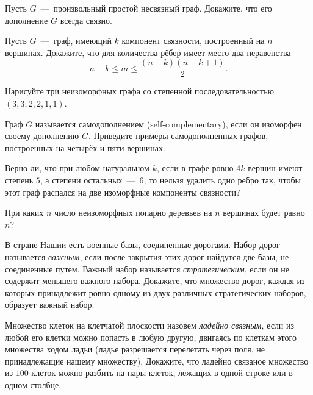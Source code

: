 \begin{exersize}
	Пусть $G$~---~произвольный простой несвязный граф. Докажите, что его дополнение $\overline{G}$ всегда связно.
\end{exersize}	

\begin{exersize}
	Пусть $G$~---~граф, имеющий $k$ компонент связности, построенный на $n$ вершинах. Докажите, что для количества рёбер 
	имеет место два неравенства $$n-k \leqslant m \leqslant \frac{(n-k)(n-k+1)}{2}.$$
\end{exersize}

\begin{exersize}
	Нарисуйте три неизоморфных графа со степенной последовательностью $(3, 3, 2, 2, 1, 1)$.
\end{exersize}

\begin{exersize}
	Граф $G$ называется самодополнением (self-complementary), если он изоморфен своему дополнению $\overline{G}$. 
	Приведите примеры самодополненных графов, построенных на четырёх и пяти вершинах.
\end{exersize}

\begin{exersize}
	Верно ли, что при любом натуральном $k$, если в графе ровно $4k$ вершин имеют степень $5$, а степени остальных~---~$6$, 
	то нельзя удалить одно ребро так, чтобы этот граф распался на две изоморфные компоненты связности?
\end{exersize}

\begin{exersize}
	При каких $n$ число неизоморфных попарно деревьев на $n$ вершинах будет равно $n$?
\end{exersize} 


\begin{exersize}
	В стране Нашии есть военные базы, соединенные дорогами. Набор дорог называется \emph{важным}, если после закрытия этих дорог 
	найдутся две базы, не соединенные путем. Важный набор называется \emph{стратегическим}, если он не содержит меньшего важного набора. 
	Докажите, что множество дорог, каждая из которых принадлежит ровно одному из двух различных стратегических наборов, образует важный набор.
\end{exersize}	

\begin{exersize}
	Множество клеток на клетчатой плоскости назовем \emph{ладейно связным}, если из любой его клетки можно попасть в любую другую, 
	двигаясь по клеткам этого множества ходом ладьи (ладье разрешается перелетать через поля, не принадлежащие нашему множеству). 
	Докажите, что ладейно связаное множество из $100$ клеток можно разбить на пары клеток, лежащих в одной строке или в одном столбце.
\end{exersize}	

